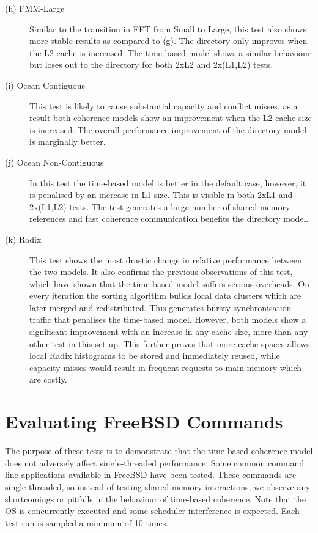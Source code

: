 \begin{description}
			\item [(h) FMM-Large] Similar to the transition in FFT from Small to Large, this test also shows more stable results as compared to (g). The directory only improves when the L2 cache is increased. The time-based model shows a similar behaviour but loses out to the directory for both 2xL2 and 2x(L1,L2) tests.
			\item [(i) Ocean Contiguous] This test is likely to cause substantial capacity and conflict misses, as a result both coherence models show an improvement when the L2 cache size is increased. The overall performance improvement of the directory model is marginally better.
			\item [(j) Ocean Non-Contiguous] In this test the time-based model is better in the default case, however, it is penalised by an increase in L1 size. This is visible in both 2xL1 and 2x(L1,L2) tests. The test generates a large number of shared memory references and fast coherence communication benefits the directory model.
			\item [(k) Radix] This test shows the most drastic change in relative performance between the two models. It also confirms the previous observations of this test, which have shown that the time-based model suffers serious overheads. On every iteration the sorting algorithm builds local data clusters which are later merged and redistributed. This generates bursty synchronisation traffic that penalises the time-based model. However, both models show a significant improvement with an increase in any cache size, more than any other test in this set-up. This further proves that more cache spaces allows local Radix histograms to be stored and immediately reused, while capacity misses would result in frequent requests to main memory which are costly.
		\end{description}


\section{Evaluating FreeBSD Commands}
	\label{results_polling}
	
	The purpose of these tests is to demonstrate that the time-based coherence model does not adversely affect single-threaded performance. Some common command line applications available in FreeBSD have been tested. These commands are single threaded, so instead of testing shared memory interactions, we observe any shortcomings or pitfalls in the behaviour of time-based coherence. Note that the OS is concurrently executed and some scheduler interference is expected. Each test run is sampled a minimum of 10 times.
	
